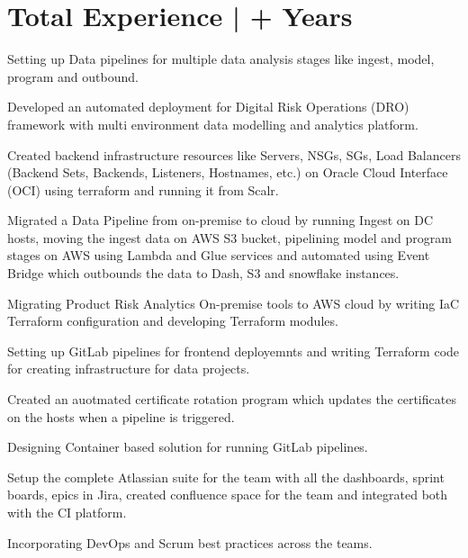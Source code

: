 \documentclass[a4paper]{deedy-resume-openfont}
\begin{document}
\section{Total Experience |  \bf\fontsize{10}{15}+ Years}
\begin{tightemize}
\item Setting up Data pipelines for multiple data analysis stages like ingest, model, program and outbound.
\item Developed an automated deployment for Digital Risk Operations (DRO) framework with multi environment data modelling and analytics platform.
\item Created backend infrastructure resources like Servers, NSGs, SGs, Load Balancers (Backend Sets, Backends, Listeners, Hostnames, etc.) on Oracle Cloud Interface (OCI) using terraform and running it from Scalr.
\item Migrated a Data Pipeline from on-premise to cloud by running Ingest on DC hosts, moving the ingest data on AWS S3 bucket, pipelining model and program stages on AWS using Lambda and Glue services and automated using Event Bridge which outbounds the data to Dash, S3 and snowflake instances.
\item Migrating Product Risk Analytics On-premise tools to AWS cloud by writing IaC Terraform configuration and developing Terraform modules.
\item Setting up GitLab pipelines for frontend deployemnts and writing Terraform code for creating infrastructure for data projects.
\item Created an auotmated certificate rotation program which updates the certificates on the hosts when a pipeline is triggered.
\item Designing Container based solution for running GitLab pipelines.
\item Setup the complete Atlassian suite for the team with all the dashboards, sprint boards, epics in Jira, created confluence space for the team and integrated both with the CI platform.
\item Incorporating DevOps and Scrum best practices across the teams.
\end{tightemize}
\sectionsep
\end{document}
